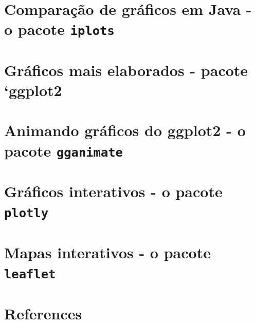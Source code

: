 \documentclass[
  letterpaper,
  DIV=11,
  numbers=noendperiod]{scrreprt}
\newlength{\cslhangindent}
\newenvironment{CSLReferences}[2] %
 {\begin{list}{}{%
  \setlength{\itemindent}{0pt}
  \setlength{\leftmargin}{0pt}
  \setlength{\parsep}{0pt}
  \ifodd #1
   \setlength{\leftmargin}{\cslhangindent}
   \setlength{\itemindent}{-1\cslhangindent}
  \fi
  \setlength{\itemsep}{#2\baselineskip}}}
 {\end{list}}
\begin{document}
\chapter{\texorpdfstring{Comparação de gráficos em Java - o pacote
\texttt{iplots}}{Comparação de gráficos em Java - o pacote iplots}}\label{comparauxe7uxe3o-de-gruxe1ficos-em-java---o-pacote-iplots}


\chapter{Gráficos mais elaborados - pacote
`ggplot2}\label{gruxe1ficos-mais-elaborados---pacote-ggplot2}


\chapter{\texorpdfstring{Animando gráficos do ggplot2 - o pacote
\texttt{gganimate}}{Animando gráficos do ggplot2 - o pacote gganimate}}\label{animando-gruxe1ficos-do-ggplot2---o-pacote-gganimate}


\chapter{\texorpdfstring{Gráficos interativos - o pacote
\texttt{plotly}}{Gráficos interativos - o pacote plotly}}\label{gruxe1ficos-interativos---o-pacote-plotly}


\chapter{\texorpdfstring{Mapas interativos - o pacote
\texttt{leaflet}}{Mapas interativos - o pacote leaflet}}\label{mapas-interativos---o-pacote-leaflet}


\chapter*{References}\label{references}


\label{refs}
\begin{CSLReferences}{0}{1}
\end{CSLReferences}
\end{document}
